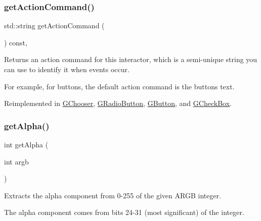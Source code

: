 \subsubsection{\texorpdfstring{get\+Action\+Command()}{getActionCommand()}}
{\footnotesize\ttfamily std\+::string get\+Action\+Command (\begin{DoxyParamCaption}{ }\end{DoxyParamCaption}) const\hspace{0.3cm}{\ttfamily [virtual]}, {\ttfamily [inherited]}}



Returns an action command for this interactor, which is a semi-\/unique string you can use to identify it when events occur. 

For example, for buttons, the default action command is the button\textquotesingle{}s text. 

Reimplemented in \mbox{\hyperlink{classsgl_1_1GChooser_a4f83505141da1f8446f0e0e0a9507930}{G\+Chooser}}, \mbox{\hyperlink{classsgl_1_1GRadioButton_a4f83505141da1f8446f0e0e0a9507930}{G\+Radio\+Button}}, \mbox{\hyperlink{classsgl_1_1GButton_a4f83505141da1f8446f0e0e0a9507930}{G\+Button}}, and \mbox{\hyperlink{classsgl_1_1GCheckBox_a4f83505141da1f8446f0e0e0a9507930}{G\+Check\+Box}}.

\mbox{\label{classsgl_1_1GCanvas_a48d898ddf58651669b5f33240a65096f}} 
\subsubsection{\texorpdfstring{get\+Alpha()}{getAlpha()}}
{\footnotesize\ttfamily int get\+Alpha (\begin{DoxyParamCaption}\item[{int}]{argb }\end{DoxyParamCaption})\hspace{0.3cm}{\ttfamily [static]}}



Extracts the alpha component from 0-\/255 of the given A\+R\+GB integer. 

The alpha component comes from bits 24-\/31 (most significant) of the integer. \mbox{\label{classsgl_1_1GDrawingSurface_ae394d39f20476570e083918d991c25bd}} 

